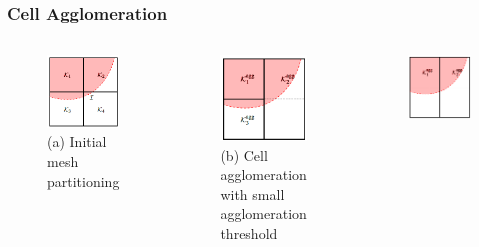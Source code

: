	\begin{frame}
		\frametitle{Cell Agglomeration}
		\begin{columns}[t]
			\column[]{7cm}
			\column[]{5cm}
			\begin{figure}[htbp]
				\vspace{-1cm}
				\includegraphics[height=0.3\textheight]{img/ibminitmesh.PNG}
				\caption*{(a) Initial mesh partitioning}
				\label{fig:init}
			\end{figure} 
			\begin{figure}[htbp]
				\vspace{-1cm}
				\includegraphics[height=0.3\textheight]{img/ibmagglomklein.PNG}
				\caption*{(b) Cell agglomeration with small agglomeration threshold}
				\label{fig:ineit}
			\end{figure} 
			\begin{figure}[htbp]
				\vspace{-1cm}
				\includegraphics[height=0.3\textheight]{img/ibmagglomgross.PNG}

\end{figure}
\end{columns}
\end{frame}
